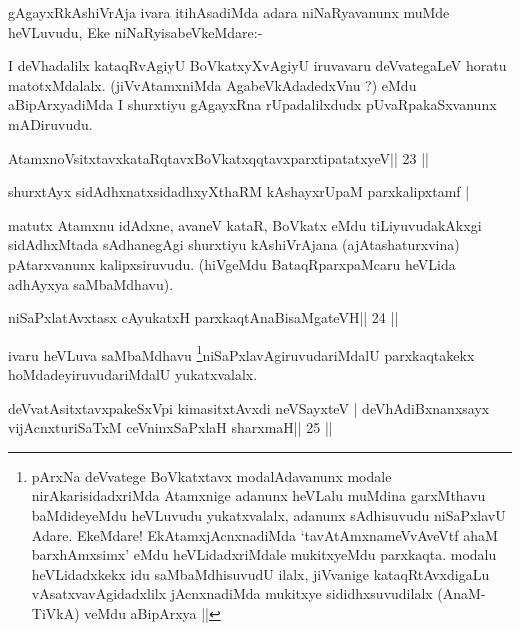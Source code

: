 \begin{artha}
gAgayxRkAshiVrAja ivara itihAsadiMda adara niNaRyavanunx muMde heVLuvudu, Eke  niNaRyisabeVkeMdare:-
\end{artha} 
 
\begin{artha}
I deVhadalilx kataqRvAgiyU BoVkatxyXvAgiyU iruvavaru deVvategaLeV horatu matotxMdalalx. (jiVvAtamxniMda AgabeVkAdadedxVnu ?) eMdu aBipArxya\-diMda I shurxtiyu gAgayxRna rUpadalilxdudx pUvaRpakaSxvanunx mADiruvudu.
\end{artha}

\begin{shl}
AtamxnoV\s sitxtavxkataRqtavxBoVkatxqqtavxparxtipatatxyeV\hfill || 23 ||
\end{shl}

\begin{shl}
shurxtAyx sidAdhxnatxsidadhxyXthaRM kAshayxrUpaM parxkalipxtamf |
\end{shl}

\begin{artha}
matutx Atamxnu idAdxne, avaneV kataR, BoVkatx eMdu tiLiyuvudakAkxgi sidAdhxMtada sAdhanegAgi shurxtiyu kAshiVrAjana (ajAtashaturxvina) pAtarxvanunx kalipxsiruvudu. (hiVgeMdu BataqRparxpaMcaru heVLida adhAyxya saMbaMdhavu).
\end{artha} 
 

\begin{shl}
niSaPxlatAvxtasx cAyukatxH parxkaqtAnaBisaMgateVH\hfill || 24 ||
\end{shl}

\begin{artha}
ivaru heVLuva saMbaMdhavu \footnote[1]{pArxNa deVvatege BoVkatxtavx 
modalAdavanunx modale nirAkarisidadxriMda Atamxnige adanunx heVLalu 
muMdina garxMthavu baMdideyeMdu heVLuvudu yukatxvalalx, adanunx sAdhisuvudu niSaPxlavU Adare. EkeMdare! EkAtamxjAcnxnadiMda `tavAtAmxnameVvAveVtf ahaM barxhAmxsimx' eMdu heVLidadxriMdale mukitxyeMdu parxkaqta. modalu heVLidadxkekx idu saMbaMdhisuvudU ilalx, jiVvanige kataqRtAvxdigaLu vAsatxvavAgidadxlilx jAcnxnadiMda mukitxye sididhxsuvudilalx (AnaM-TiVkA) veMdu aBipArxya ||
}niSaPxlavAgiruvudariMdalU parxkaqtakekx hoMdade\-yiruvudariMdalU yukatxvalalx.
\end{artha}

\begin{shl}
deVvatAsitxtavxpakeSxV\s pi kimasitxtAvxdi neVSayxteV |
deVhAdiBxnanxsayx vijAcnxturiSaTxM ceVninxSaPxlaH sharxmaH\hfill || 25 ||
\end{shl}

